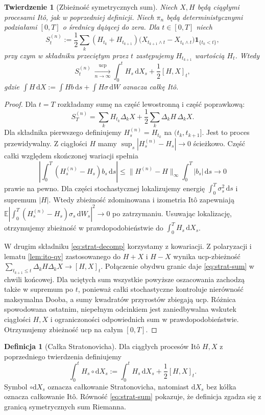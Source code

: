 \documentclass[11pt,a4paper,oneside]{report}
\numberwithin{equation}{chapter}
\theoremstyle{plain}
\newtheorem{twierdzenie}{Twierdzenie}[chapter]
\theoremstyle{definition}
\newtheorem{definicja}{Definicja}[chapter]
\theoremstyle{remark}
\newcommand{\E}{\mathbb{E}}
\newcommand{\ind}[1]{\mathbf{1}_{#1}}
\newcommand{\dd}{\mathrm{d}}
\newcommand{\norm}[1]{\lVert #1\rVert}
\begin{document}
\begin{twierdzenie}[Zbieżność symetrycznych sum]
\label{th:strat-sums}
Niech $X,H$ będą ciągłymi procesami Itô, jak w
poprzedniej definicji. Niech $\pi_n$ będą
\emph{deterministycznymi} podziałami $[0,T]$
o średnicy dążącej do zera. Dla $t\in[0,T]$
niech
\[
S_t^{(n)}:=\frac12\sum_k
(H_{t_k}+H_{t_{k+1}})
\bigl(X_{t_{k+1}\wedge t}-X_{t_k\wedge t}\bigr)
\ind{\{t_k<t\}},
\]
przy czym w składniku przeciętym przez $t$
zastępujemy $H_{t_{k+1}}$ wartością $H_t$.
Wtedy
\[
S_t^{(n)}\ \xrightarrow[n\to\infty]{\mathrm{ucp}}
\int_0^tH_s\,\dd X_s+\frac12[H,X]_t,
\tag{4.2}\label{eq:strat-sum}
\]
gdzie $\int H\,\dd X:=\int Hb\,\dd s+
\int H\sigma\,\dd W$ oznacza całkę Itô.
\end{twierdzenie}
\begin{proof}
Dla $t=T$ rozkładamy sumę na część lewostronną i
część poprawkową:
\[
S_T^{(n)}=\sum_kH_{t_k}\Delta_kX
+\frac12\sum_k\Delta_kH\,\Delta_kX.
\tag{4.3}\label{eq:strat-decomp}
\]
Dla składnika pierwszego definiujemy
$H_s^{(n)}=H_{t_k}$ na $(t_k,t_{k+1}]$.
Jest to proces przewidywalny. Z ciągłości $H$ mamy
$\sup_s|H_s^{(n)}-H_s|\to0$ ścieżkowo. Część
całki względem skończonej wariacji spełnia
\[
\left|\int_0^T(H_s^{(n)}-H_s)b_s\,\dd s\right|
\le\norm{H^{(n)}-H}_\infty\int_0^T|b_s|\,\dd s
\longrightarrow0
\]
prawie na pewno. Dla części stochastycznej
lokalizujemy energię $\int_0^T\sigma_s^2\,\dd s$
i supremum $|H|$. Wtedy zbieżność zdominowana
i izometria Itô zapewniają
$\E|\int_0^T(H_s^{(n)}-H_s)\sigma_s\,\dd W_s|^2\to0$
po zatrzymaniu. Usuwając lokalizację, otrzymujemy
zbieżność w prawdopodobieństwie do $\int_0^TH_s\,\dd X_s$.

W drugim składniku \eqref{eq:strat-decomp} korzystamy
z kowariacji. Z polaryzacji i lematu
\ref{lem:ito-qv} zastosowanego do $H+X$ i $H-X$
wynika ucp-zbieżność
$\sum_{t_{k+1}\le t}\Delta_kH\Delta_kX\to[H,X]_t$.
Połączenie obydwu granic daje \eqref{eq:strat-sum}
w chwili końcowej. Dla uciętych sum wszystkie powyższe
oszacowania zachodzą także w supremum po $t$, ponieważ
całki stochastyczne kontroluje nierówność maksymalna
Dooba, a sumy kwadratów przyrostów zbiegają ucp.
Różnica spowodowana ostatnim, niepełnym odcinkiem
jest zaniedbywalna wskutek ciągłości $H,X$ i
ograniczoności odpowiednich sum w prawdopodobieństwie.
Otrzymujemy zbieżność ucp na całym $[0,T]$.
\end{proof}

\begin{definicja}[Całka Stratonovicha]
Dla ciągłych procesów Itô $H,X$ z poprzedniego
twierdzenia definiujemy
\[
\int_0^tH_s\circ\dd X_s
:=\int_0^tH_s\,\dd X_s+\frac12[H,X]_t.
\tag{4.4}\label{eq:strat-def}
\]
Symbol $\circ\dd X_s$ oznacza całkowanie
Stratonovicha, natomiast $\dd X_s$ bez kółka
oznacza całkowanie Itô. Równość
\eqref{eq:strat-sum} pokazuje, że definicja zgadza
się z granicą symetrycznych sum Riemanna.
\end{definicja}
\end{document}
